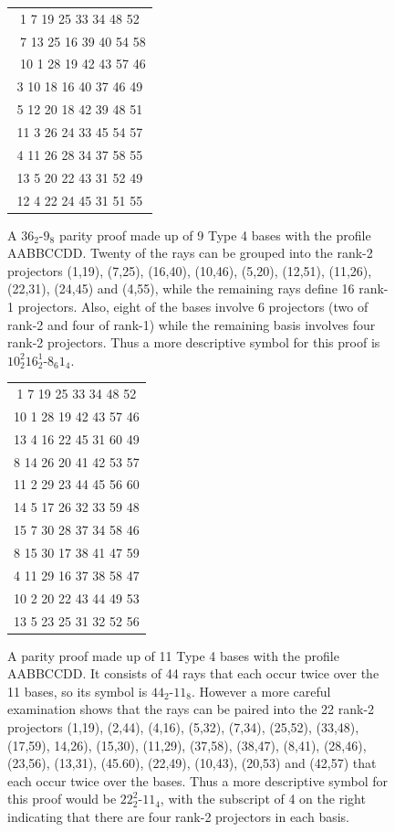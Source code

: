 \begin{figure}[ht]
\centering %
\begin{tabular}{|c |} %
\hline %
1	7	19	25	33	34	48	52\\\
7	13	25	16	39	40	54	58\\\
10	1	28	19	42	43	57	46\\
3	10	18	16	40	37	46	49\\
5	12	20	18	42	39	48	51\\
11	3	26	24	33	45	54	57\\
4	11	26	28	34	37	58	55\\
13	5	20	22	43	31	52	49\\
12	4	22	24	45	31	51	55\\
\hline
\end{tabular}
\caption{A $36_{2}$-$9_{8}$ parity proof made up of 9 Type 4 bases with the profile AABBCCDD. Twenty of the rays can be grouped into the rank-2 projectors (1,19), (7,25), (16,40), (10,46), (5,20), (12,51), (11,26), (22,31), (24,45) and (4,55), while the remaining rays define 16 rank-1 projectors. Also, eight of the bases involve 6 projectors (two of rank-2 and four of rank-1) while the remaining basis involves four rank-2 projectors. Thus a more descriptive symbol for this proof is $10^{2}_{2}16^{1}_{2}$-$8_{6}1_{4}$.}
\label{tab8}
\end{figure}

\begin{figure}[ht]
\centering %
\begin{tabular}{|c |} %
\hline %
1	7	19	25	33	34	48	52\\
10	1	28	19	42	43	57	46\\
13	4	16	22	45	31	60	49\\
8	14	26	20	41	42	53	57\\
11	2	29	23	44	45	56	60\\
14	5	17	26	32	33	59	48\\
15	7	30	28	37	34	58	46\\
8	15	30	17	38	41	47	59\\
4	11	29	16	37	38	58	47\\
10	2	20	22	43	44	49	53\\
13	5	23	25	31	32	52	56\\
\hline
\end{tabular}
\caption{A parity proof made up of 11 Type 4 bases with the profile AABBCCDD. It consists of 44 rays that each occur twice over the 11 bases, so its symbol is $44_{2}$-$11_{8}$. However a more careful examination shows that the rays can be paired into the 22 rank-2 projectors (1,19), (2,44), (4,16), (5,32), (7,34), (25,52), (33,48), (17,59), 14,26), (15,30), (11,29), (37,58), (38,47), (8,41), (28,46), (23,56), (13,31), (45.60), (22,49), (10,43), (20,53) and (42,57) that each occur twice over the bases. Thus a more descriptive symbol for this proof would be $22^{2}_{2}$-$11_{4}$, with the subscript of 4 on the right indicating that there are four rank-2 projectors in each basis.}
\label{tab8a}
\end{figure}

